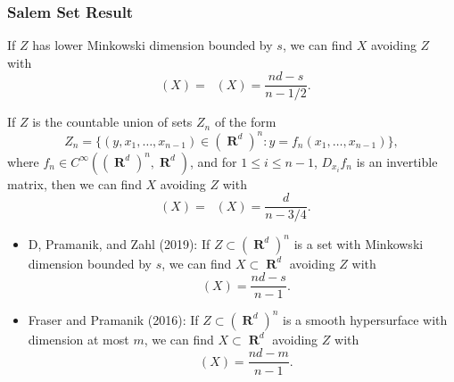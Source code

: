 \documentclass[usenames,dvipsnames,handout]{beamer}
\DeclareMathOperator{\RR}{\textbf{R}}
\DeclareMathOperator{\fordim}{\text{dim}_{\textbf{F}}}
\DeclareMathOperator{\hausdim}{\text{dim}_{\textbf{H}}}
\begin{document}






\begin{frame}
    \frametitle{Salem Set Result}

    \pause
    \begin{theorem}[2021, D]
        If $Z$ has lower Minkowski dimension bounded by $s$, we can find $X$ avoiding $Z$ with
        \[ \hausdim(X) = \fordim(X) = \frac{nd - s}{n - 1/2}. \]
    \end{theorem}

    \pause
    \begin{theorem}[2021, D]
        If $Z$ is the countable union of sets $Z_n$ of the form
        \[ Z_n = \{ (y,x_1,\dots,x_{n-1}) \in (\RR^d)^n: y = f_n(x_1,\dots,x_{n-1}) \}, \]
        where $f_n \in C^\infty((\RR^d)^n, \RR^d)$, and for $1 \leq i \leq n-1$, $D_{x_i} f_n$ is an invertible matrix, then we can find $X$ avoiding $Z$ with
        \[ \hausdim(X) = \fordim(X) = \frac{d}{n-3/4}. \]
    \end{theorem}
\end{frame}






\begin{frame}
    \begin{itemize}
        \item D, Pramanik, and Zahl (2019): If $Z \subset (\RR^d)^n$ is a set with Minkowski dimension bounded by $s$, we can find $X \subset \RR^d$ avoiding $Z$ with
        \[ \hausdim(X) = \frac{nd-s}{n-1}. \]

                \pause
        \item Fraser and Pramanik (2016): If $Z \subset (\RR^d)^n$ is a smooth hypersurface with dimension at most $m$, we can find $X \subset \RR^d$ avoiding $Z$ with
        \[ \hausdim(X) = \frac{nd-m}{n-1}. \]
    \end{itemize}
\end{frame}
\end{document}
